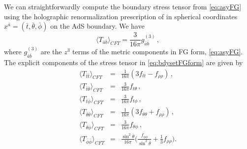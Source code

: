 \documentclass[aps,letterpaper,twocolumn,nofootinbib]{revtex4}
\numberwithin{equation}{section}
\begin{document}
We can straightforwardly compute the boundary stress tensor from \eqref{eq:asyFG} using the holographic renormalization prescription of \cite{deHaro:2000vlm} in spherical coordinates $x^{\bar{a}}=(\bar{t},\bar{\theta},\bar{\phi})$ on the AdS boundary. We have
\begin{equation}
\label{eq:bdysetFGform}
\langle T_{\bar{a}\bar{b}}\rangle_{CFT}=\frac{3}{16\pi}g^{(3)}_{\bar{a}\bar{b}}\,,
\end{equation}
where $g^{(3)}_{\bar{a}\bar{b}}$ are the $z^3$ terms of the metric components in FG form, \eqref{eq:asyFG}.
The explicit components of the stress tensor in \eqref{eq:bdysetFGform} are given by
\begin{eqnarray}
\label{eq:set_explicit_2}
\langle T_{\bar{t}\bar{t}}\rangle_{CFT}&=&\frac{1}{16\pi}(3f_{tt}-f_{\rho\rho})\,, \nonumber \\
\langle T_{\bar{t}\bar{\theta}}\rangle_{CFT}&=&\frac{3}{16\pi}f_{t\theta}\,, \nonumber \\
\langle T_{\bar{t}\bar{\phi}}\rangle_{CFT}&=&\frac{3}{16\pi}f_{t\phi}\,, \nonumber \\
\langle T_{\bar{\theta}\bar{\theta}}\rangle_{CFT}&=&\frac{1}{16\pi} (3f_{\theta\theta}+f_{\rho\rho})\,, \nonumber \\
\langle T_{\bar{\theta}\bar{\phi}}\rangle_{CFT}&=&\frac{3}{16\pi}f_{\theta\phi}\,, \nonumber \\
\langle T_{\bar{\phi}\bar{\phi}}\rangle_{CFT}&=&\frac{\sin^2\bar{\theta}}{16\pi} \biggl(\frac{f_{\phi\phi}}{ \sin^2\bar{\theta}}+\frac{1}{3}f_{\rho\rho}\biggr).
\end{eqnarray}
\end{document}
